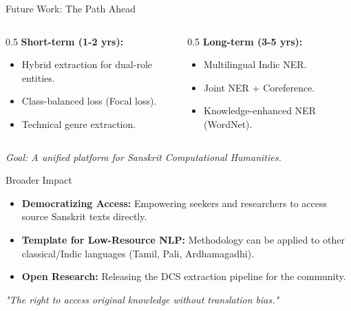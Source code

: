 \documentclass[10pt]{beamer}
\def\tpage{}
\newcommand{\tp}[1]{\def\tpage{#1}}
\begin{document}
\begin{frame}{Future Work: The Path Ahead}
    \tp{54}
    \begin{columns}
        \begin{column}{0.5\textwidth}
            \textbf{Short-term (1-2 yrs):}
            \begin{itemize}
                \item Hybrid extraction for dual-role entities.
                \item Class-balanced loss (Focal loss).
                \item Technical genre extraction.
            \end{itemize}
        \end{column}
        \begin{column}{0.5\textwidth}
            \textbf{Long-term (3-5 yrs):}
            \begin{itemize}
                \item Multilingual Indic NER.
                \item Joint NER + Coreference.
                \item Knowledge-enhanced NER (WordNet).
            \end{itemize}
        \end{column}
    \end{columns}
    \vfill
    \begin{center}
        \textit{Goal: A unified platform for Sanskrit Computational Humanities.}
    \end{center}
\end{frame}

\begin{frame}{Broader Impact}
    \tp{51}
    \begin{itemize}
        \item \textbf{Democratizing Access:} Empowering seekers and researchers to access source Sanskrit texts directly.
        \item \textbf{Template for Low-Resource NLP:} Methodology can be applied to other classical/Indic languages (Tamil, Pali, Ardhamagadhi).
        \item \textbf{Open Research:} Releasing the DCS extraction pipeline for the community.
    \end{itemize}
    \vfill
    \begin{center}
        \textit{"The right to access original knowledge without translation bias."}
    \end{center}
\end{frame}
\end{document}
